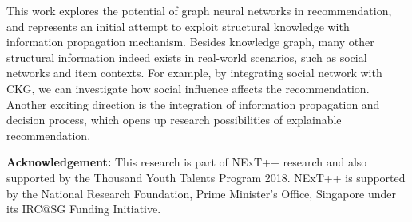 \documentclass[sigconf]{acmart}
\theoremstyle{definition}
\begin{document}
This work explores the potential of graph neural networks in recommendation, and represents an initial attempt to exploit structural knowledge with information propagation mechanism.
Besides knowledge graph, many other structural information indeed exists in real-world scenarios, such as social networks and item contexts.
For example, by integrating social network with CKG, we can investigate how social influence affects the recommendation.
Another exciting direction is the integration of information propagation and decision process, which opens up research possibilities of explainable recommendation.

\vspace{1px}
\noindent\textbf{Acknowledgement:}
This research is part of NExT++ research and also supported by the Thousand Youth Talents Program 2018.
NExT++ is supported by the National Research Foundation, Prime Minister's Office, Singapore under its IRC@SG Funding Initiative.










%
 


\balance


\balance
\end{document}
